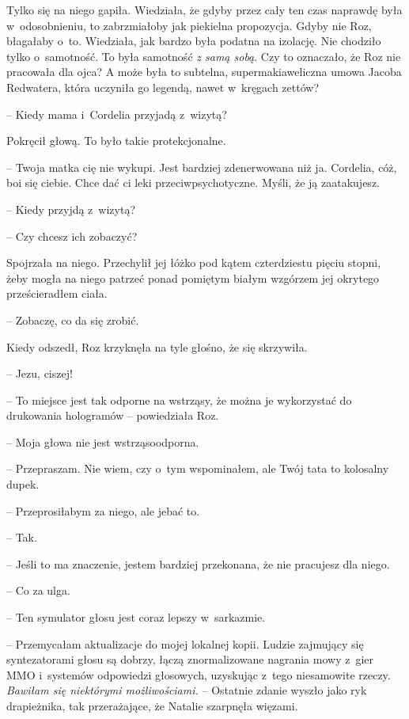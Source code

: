 \documentclass[oneside,polish,11pt,sfheadings]{mwbk}
\begin{document}
Tylko się na niego gapiła. Wiedziała, że gdyby przez cały ten czas
naprawdę była w~odosobnieniu, to zabrzmiałoby jak piekielna propozycja.
Gdyby nie Roz, błagałaby o~to. Wiedziała, jak bardzo była podatna na
izolację. Nie chodziło tylko o~samotność. To była samotność \textit{z samą
sobą}. Czy to oznaczało, że Roz nie pracowała dla ojca? A może była to
subtelna, supermakiaweliczna umowa Jacoba Redwatera, która uczyniła go
legendą, nawet w~kręgach zettów?

-- Kiedy mama i~Cordelia przyjadą z~wizytą?

Pokręcił głową. To było takie protekcjonalne. 

-- Twoja matka cię nie
wykupi. Jest bardziej zdenerwowana niż ja. Cordelia, cóż, boi się
ciebie. Chce dać ci leki przeciwpsychotyczne. Myśli, że ją zaatakujesz.

-- Kiedy przyjdą z~wizytą?

-- Czy chcesz ich zobaczyć?

Spojrzała na niego. Przechylił jej łóżko pod kątem czterdziestu pięciu
stopni, żeby mogła na niego patrzeć ponad pomiętym białym wzgórzem jej
okrytego prześcieradłem ciała.

-- Zobaczę, co da się zrobić.

Kiedy odszedł, Roz krzyknęła na tyle głośno, że się skrzywiła.

-- Jezu, ciszej!

-- To miejsce jest tak odporne na wstrząsy, że można je wykorzystać do
drukowania hologramów -- powiedziała Roz.

-- Moja głowa nie jest wstrząsoodporna.

-- Przepraszam. Nie wiem, czy o~tym wspominałem, ale Twój tata to
kolosalny dupek.

-- Przeprosiłabym za niego, ale jebać to.

-- Tak.

-- Jeśli to ma znaczenie, jestem bardziej przekonana, że nie pracujesz
dla niego.

-- Co za ulga.

-- Ten symulator głosu jest coraz lepszy w~sarkazmie.

-- Przemycałam aktualizacje do mojej lokalnej kopii. Ludzie zajmujący się
syntezatorami głosu są dobrzy, łączą znormalizowane nagrania mowy z~gier
MMO i~systemów odpowiedzi głosowych, uzyskując z~tego niesamowite
rzeczy. \textit{Bawiłam się niektórymi możliwościami.} -- Ostatnie zdanie
wyszło jako ryk drapieżnika, tak przerażające, że Natalie szarpnęła
więzami.
\end{document}
